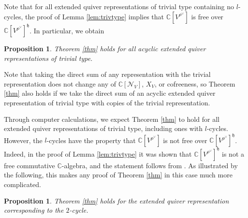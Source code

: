 \documentclass[12pt]{article}
\newcommand{\C}{\mathbb{C}}
\newtheorem{proposition}[theorem]{Proposition}
\theoremstyle{definition}
\theoremstyle{remark}
\newcommand{\N}{\mathcal{N}}
\newcommand{\h}{\mathfrak{h}}
\begin{document}
Note that for all extended quiver representations of trivial type containing no $l$-cycles, the proof of Lemma \ref{lem:trivtype} implies that $\C[V^{\rho^\vee}]$ is free over $\C[V^{\rho^\vee}]^\h$. In particular, we obtain

\begin{proposition}\label{prop:sl2s}
    Theorem \ref{thm} holds for all acyclic extended quiver representations of trivial type.
\end{proposition}

Note that taking the direct sum of any representation with the trivial representation does not change any of $\C[\N_V]$, $X_V$, or cofreeness, so Theorem \ref{thm} also holds if we take the direct sum of an acyclic extended quiver representation of trivial type with copies of the trivial representation.

Through computer calculations, we expect Theorem \ref{thm} to hold for all extended quiver representations of trivial type, including ones with $l$-cycles. However, the $l$-cycles have the property that $\C[V^{\rho^\vee}]$ is not free over $\C[V^{\rho^\vee}]^\h$. Indeed, in the proof of Lemma \ref{lem:trivtype} it was shown that $\C[V^{\rho^\vee}]^\h$ is not a free commutative $\C$-algebra, and the statement follows from \cite[Lemma 4.2.10]{springer}. As illustrated by the following, this makes any proof of Theorem \ref{thm} in this case much more complicated.

\begin{proposition}\label{prop:2cycle}
    Theorem \ref{thm} holds for the extended quiver representation corresponding to the $2$-cycle.
\end{proposition}
\end{document}
